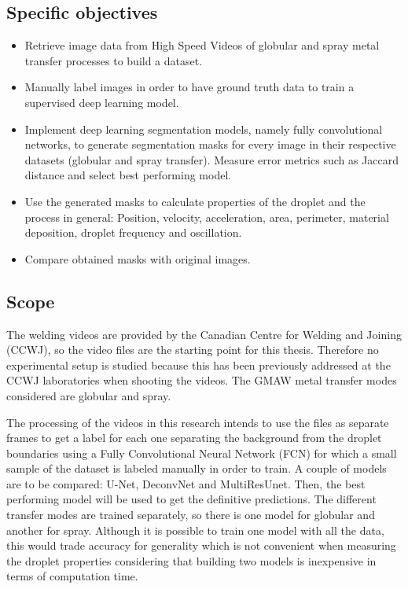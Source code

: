 \begin{intro}
\subsection{Specific objectives}
\begin{itemize}
    \item Retrieve image data from High Speed Videos of globular and spray metal transfer processes to build a dataset.
    \item Manually label images in order to have ground truth data to train a supervised deep learning model.
    \item Implement deep learning segmentation models, namely fully convolutional networks, to generate segmentation masks for every image in their respective datasets (globular and spray transfer). Measure error metrics such as Jaccard distance and select best performing model.
    \item Use the generated masks to calculate properties of the droplet and the process in general: Position, velocity, acceleration, area, perimeter, material deposition, droplet frequency and oscillation.
    \item Compare obtained masks with original images.
\end{itemize}

\subsection{Scope}

The welding videos are provided by the Canadian Centre for Welding and Joining (CCWJ), so the video files are the starting point for this thesis. Therefore no experimental setup is studied because this has been previously addressed at the CCWJ laboratories when shooting the videos. The GMAW metal transfer modes considered are globular and spray.

The processing of the videos in this research intends to use the files as separate frames to get a label for each one separating the background from the droplet boundaries using a Fully Convolutional Neural Network (FCN) for which a small sample of the dataset is labeled manually in order to train. A couple of models are to be compared: U-Net, DeconvNet and MultiResUnet. Then, the best performing model will be used to get the definitive predictions. The different transfer modes are trained separately, so there is one model for globular and another for spray. Although it is possible to train one model with all the data, this would trade accuracy for generality which is not convenient when measuring the droplet properties considering that building two models is inexpensive in terms of computation time.


\end{intro}
